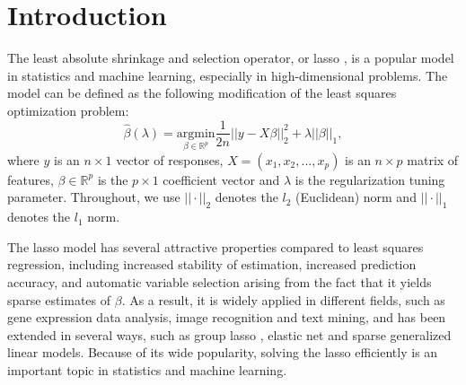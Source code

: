 
\section{Introduction}

The least absolute shrinkage and selection operator, or lasso \citep{tibshirani1996regression}, is a popular model in statistics and machine learning, especially in high-dimensional problems. The model can be defined as the following modification of the least squares optimization problem:
\begin{equation}
    \hat{\beta}(\lambda)=\underset{\beta\in \mathbb{R}^p}{\mathrm{argmin}}\frac{1}{2n}||y-X\beta||_2^2+\lambda||\beta||_1,
\end{equation}
where $y$ is an $n\times 1$ vector of responses, $X=(x_1,x_2,...,x_p)$ is an $n\times p$ matrix of features, $\beta\in \mathbb{R}^p$ is the $p\times 1$ coefficient vector and $\lambda$ is the regularization tuning parameter. Throughout, we use $||\cdot||_2$ denotes the $l_2$ (Euclidean) norm and $||\cdot||_1$ denotes the $l_1$ norm. 

The lasso model has several attractive properties compared to least squares regression, including increased stability of estimation, increased prediction accuracy, and automatic variable selection arising from the fact that it yields sparse estimates of $\beta$.  As a result, it is widely applied in different fields, such as gene expression data analysis, image recognition and text mining, and has been extended in several ways, such as group lasso \citep{yuan2006model}, elastic net \citep{zou2005regularization} and sparse generalized linear models. Because of its wide popularity, solving the lasso efficiently is an important topic in statistics and machine learning.


